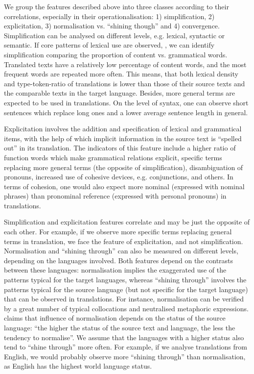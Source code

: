 \documentclass[output=paper]{LSP/langsci}
\begin{document}
We group the features described above into three classes according to their correlations, especially in their operationalisation: 1) simplification, 2) explicitation, 3) normalisation vs. “shining though” and 4) convergence. Simplification can be analysed on different levels, e.g. lexical, syntactic or semantic. If core patterns of lexical use are observed, \citep[see][]{Laviosa1998}, we can identify simplification comparing the proportion of content vs. grammatical words. Translated texts have a relatively low percentage of content words, and the most frequent words are repeated more often. This means, that both lexical density and type-token-ratio of translations is lower than those of their source texts and the comparable texts in the target language.  Besides, more general terms are expected to be used in translations.  On the level of syntax, one can observe short sentences which replace long ones and a lower average sentence length in general.

Explicitation involves the addition and specification of lexical and grammatical items, with the help of which implicit information in the source text is “spelled out” in its translation.  The indicators of this feature include a higher ratio of function words which make grammatical relations explicit, specific terms replacing more general terms (the opposite of simplification), disambiguation of pronouns, increased use of cohesive devices, e.g. conjunctions, and others. In terms of cohesion, one would also expect more nominal (expressed with nominal phrases) than pronominal reference (expressed with personal pronouns) in translations.

Simplification and explicitation features correlate and may be just the opposite of each other.  For example, if we observe more specific terms replacing general terms in translation, we face the feature of explicitation, and not simplification. Normalisation and “shining through” can also be measured on different levels, depending on the languages involved. Both features depend on the contrasts between these languages: normalisation implies the exaggerated use of the patterns typical for the target languages, whereas “shining through” involves the patterns typical for the source language (but not specific for the target language) that can be observed in translations. For instance, normalisation can be verified by a great number of typical collocations and neutralised metaphoric expressions. \citet{Baker1996} claims that influence of normalisation depends on the status of the source language: “the higher the status of the source text and language, the less the tendency to normalise”. We assume that the languages with a higher status also tend to “shine through” more often. For example, if we analyse translations from English, we would probably observe more “shining through” than normalisation, as English has the highest world language status.
\end{document}
